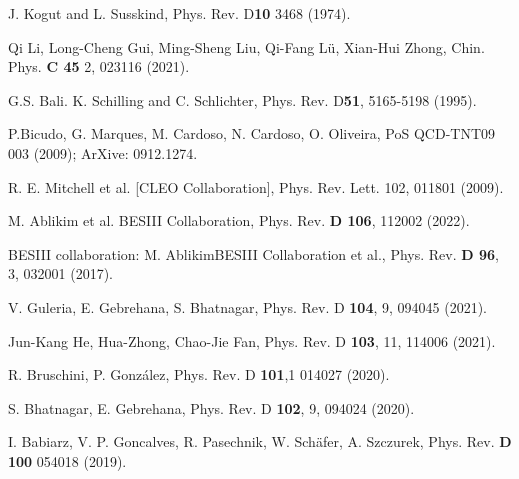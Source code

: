 \documentclass[aps,prd,superscriptaddress,eqsecnum,amsfonts,showpacs,epsfig]{revtex4}
\begin{document}
\begin{thebibliography}{00}
 J. Kogut and L. Susskind, Phys. Rev. D{\bf 10}  3468 (1974).

Qi Li, Long-Cheng Gui, Ming-Sheng Liu, Qi-Fang Lü, Xian-Hui Zhong,    Chin. Phys. {\bf C 45} 2, 023116 (2021).

 G.S. Bali. K. Schilling and C. Schlichter, Phys. Rev. D{\bf 51}, 5165-5198 (1995).
 

P.Bicudo, G. Marques, M. Cardoso, N. Cardoso, O. Oliveira,    PoS QCD-TNT09 003 (2009); ArXive: 0912.1274.

R. E. Mitchell et al. [CLEO Collaboration], Phys. Rev. Lett. 102, 011801 (2009).

M. Ablikim et al. BESIII Collaboration, Phys. Rev. {\bf D 106}, 112002 (2022).

BESIII collaboration: M. AblikimBESIII Collaboration et al., Phys. Rev. {\bf D 96}, 3, 032001 (2017).

V. Guleria, E. Gebrehana, S. Bhatnagar, Phys. Rev. D {\bf 104}, 9, 094045 (2021).

Jun-Kang He, Hua-Zhong, Chao-Jie Fan, Phys. Rev. D {\bf 103}, 11, 114006 (2021).

R. Bruschini, P. González, Phys. Rev. D {\bf 101},1 014027 (2020).
    
S. Bhatnagar, E. Gebrehana, Phys. Rev. D {\bf 102}, 9, 094024 (2020).
    
I. Babiarz, V. P. Goncalves, R. Pasechnik, W. Schäfer, A. Szczurek, Phys. Rev. {\bf D 100}   054018 (2019).


\end{thebibliography}
\end{document}
